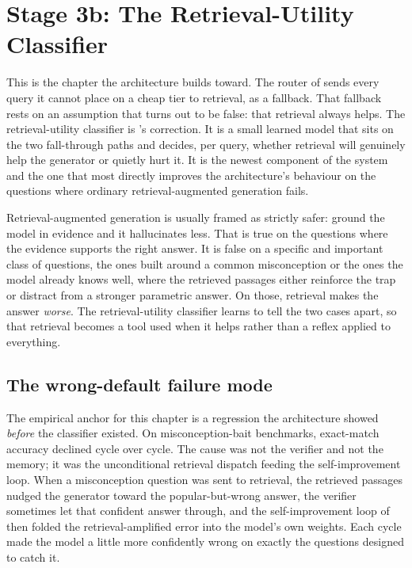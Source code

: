 \chapter{Stage 3b: The Retrieval-Utility Classifier}
\label{ch:ruc}

This is the chapter the architecture builds toward. The router of 
sends every query it cannot place on a cheap tier to retrieval, as a fallback. That
fallback rests on an assumption that turns out to be false: that retrieval always
helps. The retrieval-utility classifier is \caem{}'s correction. It is a small
learned model that sits on the two fall-through paths and decides, per query,
whether retrieval will genuinely help the generator or quietly hurt it. It is the
newest component of the system and the one that most directly improves the
architecture's behaviour on the questions where ordinary retrieval-augmented
generation fails.

\begin{intuition}
Retrieval-augmented generation is usually framed as strictly safer: ground the
model in evidence and it hallucinates less. That is true on the questions where the
evidence supports the right answer. It is false on a specific and important class of
questions, the ones built around a common misconception or the ones the model
already knows well, where the retrieved passages either reinforce the trap or
distract from a stronger parametric answer. On those, retrieval makes the answer
\emph{worse}. The retrieval-utility classifier learns to tell the two cases apart,
so that retrieval becomes a tool used when it helps rather than a reflex applied to
everything.
\end{intuition}

\section{The wrong-default failure mode}
\label{sec:ruc-motivation}

The empirical anchor for this chapter is a regression the architecture showed
\emph{before} the classifier existed. On misconception-bait benchmarks, exact-match
accuracy declined cycle over cycle. The cause was not the verifier and not the
memory; it was the unconditional retrieval dispatch feeding the self-improvement
loop. When a misconception question was sent to retrieval, the retrieved passages
nudged the generator toward the popular-but-wrong answer, the verifier sometimes let
that confident answer through, and the self-improvement loop of  then
folded the retrieval-amplified error into the model's own weights. Each cycle made
the model a little more confidently wrong on exactly the questions designed to catch
it.

